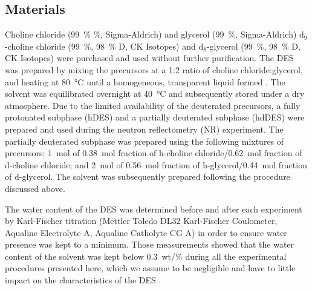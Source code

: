 \documentclass[amsmath,amssymb,twocolumn,superscriptaddress]{revtex4-1}
\begin{document}
\subsection{Materials}
%
Choline chloride (\SI{99}{\percent} \%, Sigma-Aldrich) and glycerol (\SI{99}{\percent}, Sigma-Aldrich) d$_9$-choline chloride (\SI{99}{\percent}, \SI{98}{\percent} D, CK Isotopes) and d$_8$-glycerol (\SI{99}{\percent}, \SI{98}{\percent} D, CK Isotopes) were purchased and used without further purification.
The DES was prepared by mixing the precursors at a 1:2 ratio of choline chloride:glycerol, and heating at \SI{80}{\celsius} until a homogeneous, transparent liquid formed \cite{smith_deep_2014}.
The solvent was equilibrated overnight at \SI{40}{\celsius} and subsequently stored under a dry atmosphere.
Due to the limited availability of the deuterated precursors, a fully protonated subphase (hDES) and a partially deuterated subphase (hdDES) were prepared and used during the neutron reflectometry (NR) experiment.
The partially deuterated subphase was prepared using the following mixtures of precursors: \SI{1}{\mole} of \SI{0.38}{\mole} fraction of h-choline chloride/\SI{0.62}{\mole} fraction of d-choline chloride; and \SI{2}{\mole} of \SI{0.56}{\mole} fraction of h-glycerol/\SI{0.44}{\mole} fraction of d-glycerol.
The solvent was subsequently prepared following the procedure discussed above.

The water content of the DES was determined before and after each experiment by Karl-Fischer titration (Mettler Toledo DL32 Karl-Fischer Coulometer, Aqualine Electrolyte A, Aqualine Catholyte CG A) in order to ensure water presence was kept to a minimum.
Those measurements showed that the water content of the solvent was kept below \SI{0.3}{wt/\percent} during all the experimental procedures presented here, which we assume to be negligible and have to little impact on the characteristics of the DES \cite{hammond_liquid_2016,hammond_resilience_2017}.
\end{document}
